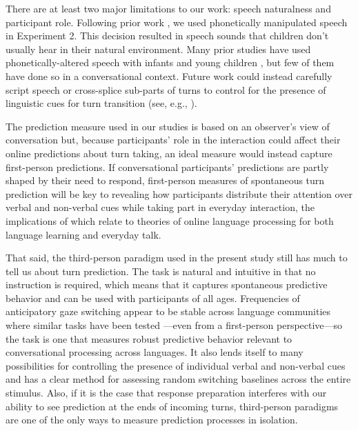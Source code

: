 \documentclass[authoryear, 12pt]{elsarticle}
\begin{document}
There are at least two major limitations to our work: speech naturalness and participant role. Following prior work \citep{de-ruiter2006, keitel2013}, we used phonetically manipulated speech in Experiment 2. This decision resulted in speech sounds that children don't usually hear in their natural environment. Many prior studies have used phonetically-altered speech with infants and young children \citep[cf.][]{jusczyk2000}, but few of them have done so in a conversational context. Future work could instead carefully script speech or cross-splice sub-parts of turns to control for the presence of linguistic cues for turn transition (see, e.g., \citealp{torreira2015}).

The prediction measure used in our studies is based on an observer's view of conversation but, because participants' role in the interaction could affect their online predictions about turn taking, an ideal measure would instead capture first-person predictions. If conversational participants' predictions are partly shaped by their need to respond, first-person measures of spontaneous turn prediction will be key to revealing how participants distribute their attention over verbal and non-verbal cues while taking part in everyday interaction, the implications of which relate to theories of online language processing for both language learning and everyday talk.

That said, the third-person paradigm used in the present study still has much to tell us about turn prediction. The task is natural and intuitive in that no instruction is required, which means that it captures spontaneous predictive behavior and can be used with participants of all ages. Frequencies of anticipatory gaze switching appear to be stable across language communities where similar tasks have been tested \citep{keitel2013, keitel2015, holler2015, hirvenkari2013}---even from a first-person perspective---so the task is one that measures robust predictive behavior relevant to conversational processing across languages. It also lends itself to many possibilities for controlling the presence of individual verbal and non-verbal cues and has a clear method for assessing random switching baselines across the entire stimulus. Also, if it is the case that response preparation interferes with our ability to see prediction at the ends of incoming turns, third-person paradigms are one of the only ways to measure prediction processes in isolation.
\end{document}
